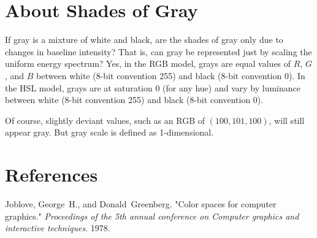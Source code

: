 \documentclass{article}
\begin{document}
\section{About Shades of Gray}

If gray is a mixture of white and black, are the shades of gray only due to
changes in baseline intensity? That is, can gray be represented just by scaling
the uniform energy spectrum? Yes, in the RGB model, grays are equal values of
$R$, $G$, and $B$ between white (8-bit convention 255) and black (8-bit
convention 0). In the HSL model, grays are at saturation 0 (for any hue) and
vary by luminance between white (8-bit convention 255) and black (8-bit
convention 0).

Of course, slightly deviant values, such as an RGB of $(100, 101, 100)$, will
still appear gray. But gray scale is defined as 1-dimensional.

\section{References}

\noindent Joblove, George~H., and Donald~Greenberg. "Color spaces for computer graphics."
\emph{Proceedings of the 5th annual conference on Computer graphics and
interactive techniques}. 1978.
\end{document}
